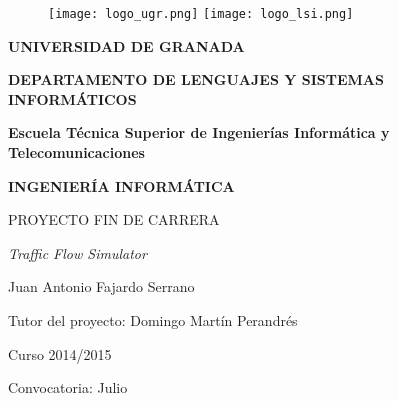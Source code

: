 \begin{titlepage}

	\begin{figure}[htbp] 
		\centering 
		\texttt{[image: logo\_ugr.png]}
		\hspace{3.0cm}
		\texttt{[image: logo\_lsi.png]}
	\end{figure}
    
	\begin{center}
	
		\vspace{1.0cm}
		
		\LARGE{\textbf{UNIVERSIDAD DE GRANADA}} \\
		
		\vspace{1.0cm}
		
		\LARGE{\textbf{DEPARTAMENTO DE LENGUAJES Y SISTEMAS INFORMÁTICOS}} \\
		
		\vspace{1.0cm}
		
		\textbf{Escuela Técnica Superior de Ingenierías Informática y Telecomunicaciones} \\
		
		\vspace{1.0cm}
		
		\Large{\textbf{INGENIERÍA INFORMÁTICA}} \\
		
		\vspace{1.0cm}
		
		\Large{PROYECTO FIN DE CARRERA} \\
		
		\vspace{0.5cm}

		\Large{\emph{Traffic Flow Simulator}} \\
		
		\vspace{1cm}
		
		\Large{Juan Antonio Fajardo Serrano} \\
		
		\vspace{0.5cm}
		
		\Large{Tutor del proyecto: Domingo Martín Perandrés} \\
		
		\vspace{0.5cm}
		
		\small{Curso 2014/2015}
		
		\vspace{0.2cm}
		
		\small{Convocatoria: Julio}
		
	\end{center}
\end{titlepage}